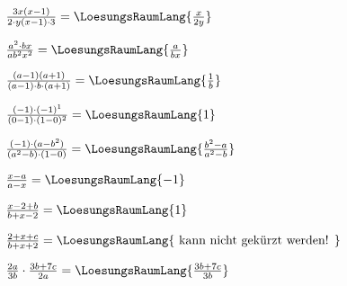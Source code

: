 \begin{bbwAufgabenBlock}
\item $\frac{3x(x-1)}{2\cdot{}y(x-1)\cdot{}3} = \LoesungsRaumLang{\frac{x}{2y}}$

\item $\frac{a^2\cdot{}bx}{ab^2x^2} = \LoesungsRaumLang{\frac{a}{bx}}$

\item $\frac{(a-1)(a+1)}{(a-1)\cdot{}b\cdot{}(a+1)} = \LoesungsRaumLang{\frac{1}{b}}$

\item $\frac{(-1)\cdot{}(-1)^1}{(0-1)\cdot{}(1-0)^2} = \LoesungsRaumLang{1}$

\item $\frac{(-1)\cdot{}(a-b^2)}{(a^2-b)\cdot{}(1-0)} = \LoesungsRaumLang{\frac{b^2-a}{a^2-b}}$

\item $\frac{x-a}{a-x} = \LoesungsRaumLang{-1}$

\item $\frac{x-2+b}{b+x-2} = \LoesungsRaumLang{1}$

\item $\frac{2+x+c}{b+x+2} = \LoesungsRaumLang{\textrm{ kann nicht
gekürzt werden! }}$

\item $\frac{2a}{3b} \cdot \frac{3b+7c}{2a} = \LoesungsRaumLang{\frac{3b+7c}{3b}}$

\end{bbwAufgabenBlock}

\platzFuerBerechnungenBisEndeSeite{}


